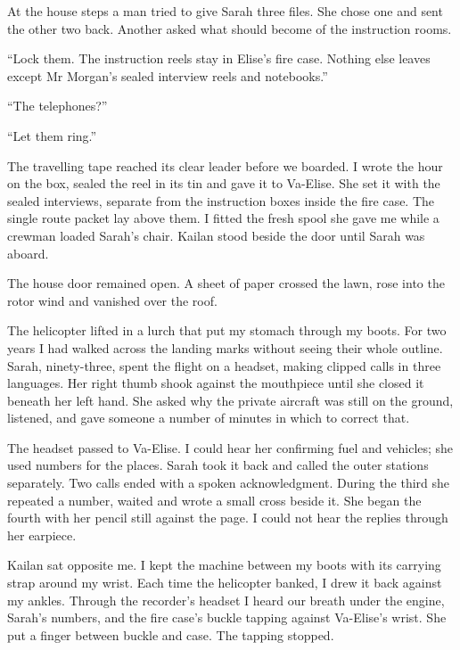 At the house steps a man tried to give Sarah three files. She chose one and sent the other two back. Another asked what should become of the instruction rooms.\par

``Lock them. The instruction reels stay in Elise's fire case. Nothing else leaves except Mr Morgan's sealed interview reels and notebooks.''\par

``The telephones?''\par

``Let them ring.''\par

The travelling tape reached its clear leader before we boarded. I wrote the hour on the box, sealed the reel in its tin and gave it to Va-Elise. She set it with the sealed interviews, separate from the instruction boxes inside the fire case. The single route packet lay above them. I fitted the fresh spool she gave me while a crewman loaded Sarah's chair. Kailan stood beside the door until Sarah was aboard.\par

The house door remained open. A sheet of paper crossed the lawn, rose into the rotor wind and vanished over the roof.\par

The helicopter lifted in a lurch that put my stomach through my boots. For two years I had walked across the landing marks without seeing their whole outline. Sarah, ninety-three, spent the flight on a headset, making clipped calls in three languages. Her right thumb shook against the mouthpiece until she closed it beneath her left hand. She asked why the private aircraft was still on the ground, listened, and gave someone a number of minutes in which to correct that.\par

The headset passed to Va-Elise. I could hear her confirming fuel and vehicles; she used numbers for the places. Sarah took it back and called the outer stations separately. Two calls ended with a spoken acknowledgment. During the third she repeated a number, waited and wrote a small cross beside it. She began the fourth with her pencil still against the page. I could not hear the replies through her earpiece.\par

Kailan sat opposite me. I kept the machine between my boots with its carrying strap around my wrist. Each time the helicopter banked, I drew it back against my ankles. Through the recorder's headset I heard our breath under the engine, Sarah's numbers, and the fire case's buckle tapping against Va-Elise's wrist. She put a finger between buckle and case. The tapping stopped.\par

